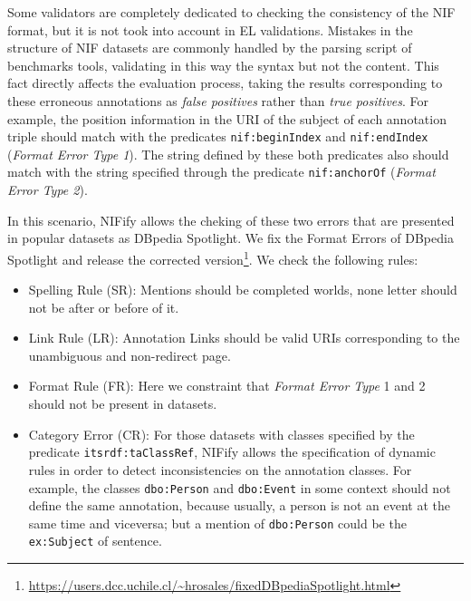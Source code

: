 \documentclass[sigconf]{acmart}
\begin{document}
Some validators are completely dedicated to checking the consistency of the NIF format, but it is not took into account in EL validations. Mistakes in the structure of NIF datasets are commonly handled by the parsing script of benchmarks tools, validating in this way the syntax but not the content. This fact directly affects the evaluation process, taking the results corresponding to these erroneous annotations as \textit{false positives} rather than \textit{true positives}. For example, the position information in the URI of the subject of each annotation triple should match with the predicates \texttt{nif:beginIndex} and \texttt{nif:endIndex} (\textit{Format Error Type 1}). The string defined by these both predicates also should match with the string specified through the predicate \texttt{nif:anchorOf} (\textit{Format Error Type 2}). 

In this scenario, NIFify allows the cheking of these two errors that are presented in popular datasets as DBpedia Spotlight. We fix the Format Errors of DBpedia Spotlight and release the corrected version\footnote{\url{https://users.dcc.uchile.cl/~hrosales/fixedDBpediaSpotlight.html}}. We check the following rules:

\begin{itemize} 
\item Spelling Rule (SR): Mentions should be completed worlds, none letter should not be after or before of it.
\item Link Rule (LR): Annotation Links should be valid URIs corresponding to the unambiguous and non-redirect page.
\item Format Rule (FR): Here we constraint that \textit{Format Error Type} 1 and 2 should not be present in datasets.
\item Category Error (CR): For those datasets with classes specified by the predicate \texttt{itsrdf:taClassRef}, NIFify allows the specification of dynamic rules in order to detect inconsistencies on the annotation classes. For example, the classes \texttt{dbo:Person} and \texttt{dbo:Event} in some context should not define the same annotation, because usually, a person is not an event at the same time and viceversa; but a mention of \texttt{dbo:Person} could be the \texttt{ex:Subject} of sentence. 
\end{itemize}
\end{document}
